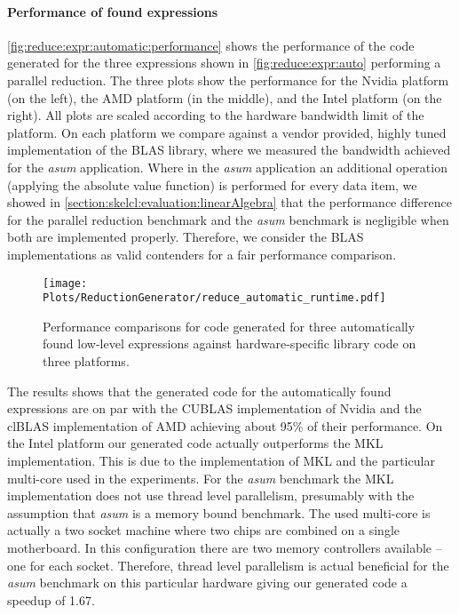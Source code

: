 \paragraph{Performance of found expressions}
\autoref{fig:reduce:expr:automatic:performance} shows the performance of the code generated for the three expressions shown in \autoref{fig:reduce:expr:auto} performing a parallel reduction.
The three plots show the performance for the Nvidia platform (on the left), the AMD platform (in the middle), and the Intel platform (on the right).
All plots are scaled according to the hardware bandwidth limit of the platform.
On each platform we compare against a vendor provided, highly tuned implementation of the BLAS library, where we measured the bandwidth achieved for the \emph{asum} application.
Where in the \emph{asum} application an additional operation (applying the absolute value function) is performed for every data item, we showed in \autoref{section:skelcl:evaluation:linearAlgebra} that the performance difference for the parallel reduction benchmark and the \emph{asum} benchmark is negligible when both are implemented properly.
Therefore, we consider the BLAS implementations as valid contenders for a fair performance comparison.

\begin{figure}
  \centering
  \texttt{[image: Plots/ReductionGenerator/reduce\_automatic\_runtime.pdf]}
  \caption{Performance comparisons for code generated for three automatically found low-level expressions against hardware-specific library code on three platforms.}
  \label{fig:reduce:expr:automatic:performance}
\end{figure}

The results shows that the generated code for the automatically found expressions are on par with the CUBLAS implementation of Nvidia and the clBLAS implementation of AMD achieving about 95\% of their performance.
On the Intel platform our generated code actually outperforms the MKL implementation.
This is due to the implementation of MKL and the particular multi-core \CPU used in the experiments.
For the \emph{asum} benchmark the MKL implementation does not use thread level parallelism, presumably with the assumption that \emph{asum} is a memory bound benchmark.
The used multi-core \CPU is actually a two socket machine where two chips are combined on a single motherboard.
In this configuration there are two memory controllers available -- one for each socket.
Therefore, thread level parallelism is actual beneficial for the \emph{asum} benchmark on this particular hardware giving our generated code a speedup of 1.67.

